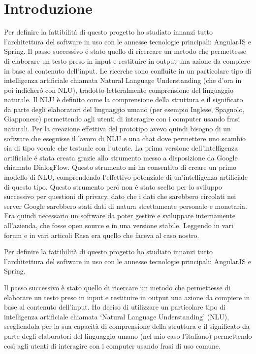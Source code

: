 \chapter{Introduzione}


Per definire la fattibilit\'{a} di questo progetto ho studiato innanzi tutto l'architettura del software in uso con le annesse tecnologie principali: AngularJS e Spring.
Il passo successivo \'{e} stato quello di ricercare un metodo che permettesse di elaborare un testo preso in input e restituire in output una azione da compiere in base al contenuto dell'input. Le ricerche sono confluite in un particolare tipo di intelligenza artificiale chiamata Natural Language Understanding (che d'ora in poi indicher\'{o} con NLU), tradotto letteralmente comprensione del linguaggio naturale. 
Il NLU \`{e} definito come la comprensione della struttura e il significato da parte degli elaboratori del linguaggio umano (per esempio Inglese, Spagnolo, Giapponese) permettendo agli utenti di interagire con i computer usando frasi naturali.
Per la creazione effettiva del prototipo avevo quindi bisogno di un software che eseguisse il lavoro di NLU e una chat dove permettere uno scambio sia di tipo vocale che testuale con l'utente.
La prima versione dell'intelligenza artificiale \'e stata creata grazie allo strumento messo a disposizione da Google chiamato DialogFlow. Questo strumento mi ha consentito di creare un primo modello di NLU, comprendendo l'effettivo potenziale di un'intelligenza artificiale di questo tipo. 
Questo strumento per\'o non \'e stato scelto per lo sviluppo successivo per questioni di privacy, dato che i dati che sarebbero circolati nei server Google sarebbero stati dati di natura strettamente personale e monetaria.
Era quindi necessario un software da poter gestire e sviluppare internamente all'azienda, che fosse open source e in una versione stabile. Leggendo in vari forum e in vari articoli Rasa era quello che faceva al caso nostro.





Per definire la fattibilità di questo progetto ho studiato innanzi tutto l’architettura del software in uso con le annesse tecnologie principali: AngularJS e Spring.

Il passo successivo è stato quello di ricercare un metodo che permettesse di elaborare un testo preso in input e restituire in output una azione da compiere in base al contenuto dell’input. Ho deciso di utilizzare un particolare tipo di intelligenza artificiale chiamata ‘Natural Language Understanding’ (NLU), scegliendola per la sua capacità di comprensione della struttura e il significato da parte degli elaboratori del linguaggio umano (nel mio caso l’italiano) permettendo così agli utenti di interagire con i computer usando frasi di uso comune.

